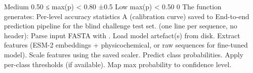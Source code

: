 {}\markdownRendererPipe{} Medium \markdownRendererPipe{} 0.50 ≤ max(p) < 0.80 \markdownRendererPipe{} ±0.5 \markdownRendererPipe{}\markdownRendererSoftLineBreak
{}\markdownRendererPipe{} Low \markdownRendererPipe{} max(p) < 0.50 \markdownRendererPipe{} 0 \markdownRendererPipe{}\markdownRendererParagraphSeparator
{}The  function generates:\markdownRendererInterblockSeparator
{}\markdownRendererUlBeginTight
\markdownRendererUlItem Per-level accuracy statistics\markdownRendererUlItemEnd 
\markdownRendererUlItem A  (calibration curve) saved to \markdownRendererUlItemEnd 
\markdownRendererUlEndTight \markdownRendererInterblockSeparator
{}\markdownRendererThematicBreak{}\markdownRendererInterblockSeparator
{}
\markdownRendererSectionEnd \markdownRendererSectionBegin
{}\markdownRendererInterblockSeparator
{} End-to-end prediction pipeline for the blind challenge test set.\markdownRendererInterblockSeparator
{}\markdownRendererInterblockSeparator
{} (one line per sequence, no header):\markdownRendererInterblockSeparator
{}\markdownRendererInterblockSeparator
{}\markdownRendererInterblockSeparator
{}\markdownRendererOlBeginTight
{}Parse input FASTA with .\markdownRendererOlItemEnd 
{}Load model artefact(s) from disk.\markdownRendererOlItemEnd 
{}Extract features (ESM-2 embeddings + physicochemical, or raw sequences for fine-tuned model).\markdownRendererOlItemEnd 
{}Scale features using the saved scaler.\markdownRendererOlItemEnd 
{}Predict class probabilities.\markdownRendererOlItemEnd 
{}Apply per-class thresholds (if available).\markdownRendererOlItemEnd 
{}Map max probability to confidence level.\markdownRendererOlItemEnd 
